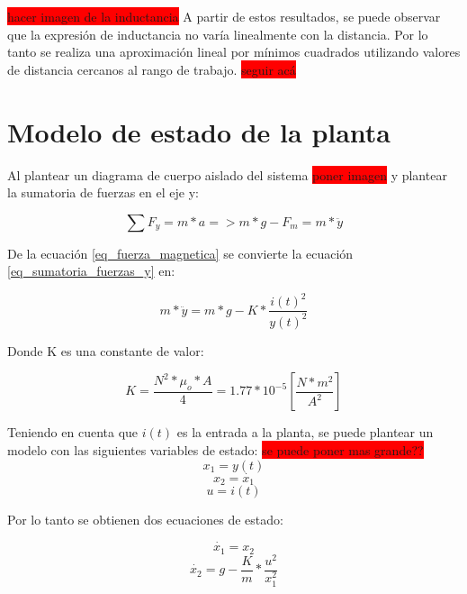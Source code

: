 \noindent \colorbox{red}{hacer imagen de la inductancia} A partir de estos resultados, se puede observar que la expresión de inductancia no varía linealmente con la distancia. Por lo tanto se realiza una aproximación lineal por mínimos cuadrados utilizando valores de distancia cercanos al rango de trabajo. \colorbox{red}{seguir acá}

\section{Modelo de estado de la planta}

\noindent Al plantear un diagrama de cuerpo aislado del sistema \colorbox{red}{poner imagen} y plantear la sumatoria de fuerzas en el eje y:

\begin{equation}\label{eq_sumatoria_fuerzas_y}
	\sum F_{y}=m*a=>m*g-F_{m}=m*\ddot{y}
\end{equation}

\noindent De la ecuación \ref{eq_fuerza_magnetica} se convierte la ecuación \ref{eq_sumatoria_fuerzas_y} en:

\begin{equation}\label{eq_sumatoria_fuerzas_y_2}
	m*\ddot{y}=m*g-K*\frac{i(t)^{2}}{y(t)^{2}}
\end{equation}

\noindent Donde K es una constante de valor:

\begin{equation}
	K=\frac{N^{2}*\mu_{o}*A}{4}=1.77*10^{-5} [\frac{N*m^2}{A^2}]
\end{equation}

\noindent Teniendo en cuenta que $i(t)$ es la entrada a la planta, se puede plantear un modelo con las siguientes variables de estado:\newline
\colorbox{red}{se puede poner mas grande??}
\begin{equation}
	x_{1}=y(t)
\end{equation}
\begin{equation}
	x_{2}=\dot{x_{1}}
\end{equation}
\begin{equation}
	u=i(t)
\end{equation}

\noindent Por lo tanto se obtienen dos ecuaciones de estado:

\begin{equation}
	\dot{x_{1}}=x_{2}
\end{equation}
\begin{equation}
	\dot{x_{2}}=g-\frac{K}{m}*\frac{u^{2}}{x_{1}^{2}}
\end{equation}

